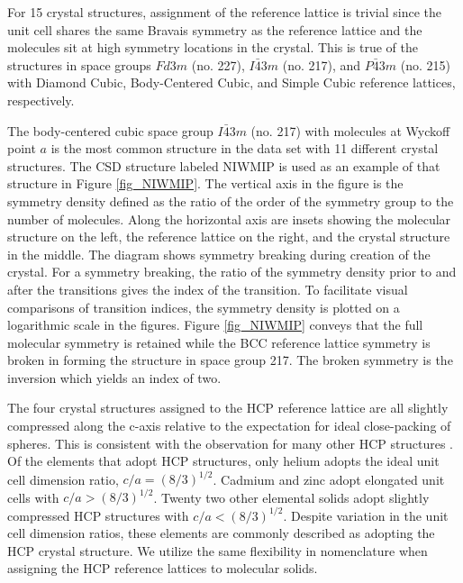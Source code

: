 \documentclass{iucr}              %
\begin{document}
For 15 crystal structures, assignment of the reference lattice is trivial since the unit cell shares the same Bravais symmetry as the reference lattice and the molecules sit at high symmetry locations in the crystal.  This is true of the structures in space groups $Fd3m$ (no. 227), $I\bar{4}3m$ (no. 217), and $P\bar{4}3m$ (no. 215) with Diamond Cubic, Body-Centered Cubic, and Simple Cubic reference lattices, respectively.  

The body-centered cubic space group $I\bar{4}3m$ (no. 217) with molecules at Wyckoff point $a$ is the most common structure in the data set with 11 different crystal structures.  The CSD structure labeled NIWMIP is used as an example of that structure in Figure \ref{fig_NIWMIP}.  The vertical axis in the figure is the symmetry density defined as the ratio of the order of the symmetry group to the number of molecules.  Along the horizontal axis are insets showing the molecular structure on the left, the reference lattice on the right, and the crystal structure in the middle.  The diagram shows symmetry breaking during creation of the crystal.  For a symmetry breaking, the ratio of the symmetry density prior to and after the transitions gives the index of the transition.  To facilitate visual comparisons of transition indices, the symmetry density is plotted on a logarithmic scale in the figures.  Figure \ref{fig_NIWMIP} conveys that the full molecular symmetry is retained while the BCC reference lattice symmetry is broken in forming the structure in space group 217.  The broken symmetry is the inversion which yields an index of two.

The four crystal structures assigned to the HCP reference lattice are all slightly compressed along the c-axis relative to the expectation for ideal close-packing of spheres.  This is consistent with the observation for many other HCP structures \cite{Sands93}.  Of the elements that adopt HCP structures, only helium adopts the ideal unit cell dimension ratio, $c/a=(8/3)^{1/2}$.  Cadmium and zinc adopt elongated unit cells with $c/a>(8/3)^{1/2}$.  Twenty two other elemental solids adopt slightly compressed HCP structures with $c/a<(8/3)^{1/2}$.  Despite variation in the unit cell dimension ratios, these elements are commonly described as adopting the HCP crystal structure.  We utilize the same flexibility in nomenclature when assigning the HCP reference lattices to molecular solids.
\end{document}
